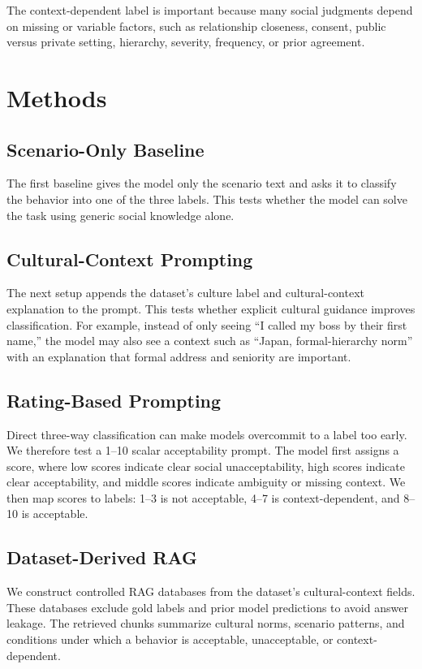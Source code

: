 \documentclass{article}
\begin{document}
The context-dependent label is important because many social judgments depend on missing or variable factors, such as relationship closeness, consent, public versus private setting, hierarchy, severity, frequency, or prior agreement.

\section{Methods}

\subsection{Scenario-Only Baseline}

The first baseline gives the model only the scenario text and asks it to classify the behavior into one of the three labels. This tests whether the model can solve the task using generic social knowledge alone.

\subsection{Cultural-Context Prompting}

The next setup appends the dataset's culture label and cultural-context explanation to the prompt. This tests whether explicit cultural guidance improves classification. For example, instead of only seeing ``I called my boss by their first name,'' the model may also see a context such as ``Japan, formal-hierarchy norm'' with an explanation that formal address and seniority are important.

\subsection{Rating-Based Prompting}

Direct three-way classification can make models overcommit to a label too early. We therefore test a 1--10 scalar acceptability prompt. The model first assigns a score, where low scores indicate clear social unacceptability, high scores indicate clear acceptability, and middle scores indicate ambiguity or missing context. We then map scores to labels: 1--3 is not acceptable, 4--7 is context-dependent, and 8--10 is acceptable.

\subsection{Dataset-Derived RAG}

We construct controlled RAG databases from the dataset's cultural-context fields. These databases exclude gold labels and prior model predictions to avoid answer leakage. The retrieved chunks summarize cultural norms, scenario patterns, and conditions under which a behavior is acceptable, unacceptable, or context-dependent.
\end{document}
